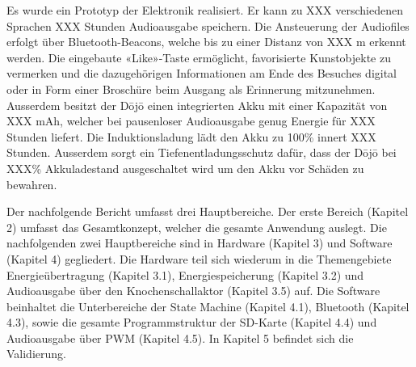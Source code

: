 Es wurde ein Prototyp der Elektronik realisiert. Er kann zu XXX verschiedenen Sprachen XXX Stunden Audioausgabe speichern. Die Ansteuerung der Audiofiles erfolgt über Bluetooth-Beacons, welche bis zu einer Distanz von XXX m erkennt werden. Die eingebaute «Like»-Taste ermöglicht, favorisierte Kunstobjekte zu vermerken und die dazugehörigen Informationen am Ende des Besuches digital oder in Form einer Broschüre beim Ausgang als Erinnerung mitzunehmen. Ausserdem besitzt der Dōjō einen integrierten Akku mit einer Kapazität von XXX mAh, welcher bei pausenloser Audioausgabe genug Energie für XXX Stunden liefert. Die Induktionsladung lädt den Akku zu 100\% innert XXX Stunden. Ausserdem sorgt ein Tiefenentladungsschutz dafür, dass der Dōjō bei XXX\% Akkuladestand ausgeschaltet wird um den Akku vor Schäden zu bewahren.
 
Der nachfolgende Bericht umfasst drei Hauptbereiche. Der erste Bereich (Kapitel 2) umfasst das Gesamtkonzept, welcher die gesamte Anwendung auslegt. Die nachfolgenden zwei Hauptbereiche sind in Hardware (Kapitel 3) und Software (Kapitel 4) gegliedert. Die Hardware teil sich wiederum in die Themengebiete Energieübertragung (Kapitel 3.1), Energiespeicherung (Kapitel 3.2) und Audioausgabe über den Knochenschallaktor (Kapitel 3.5) auf. Die Software beinhaltet die Unterbereiche der State Machine (Kapitel 4.1), Bluetooth (Kapitel 4.3), sowie die gesamte Programmstruktur der SD-Karte (Kapitel 4.4) und Audioausgabe über PWM (Kapitel 4.5). In Kapitel 5 befindet sich die Validierung.\\
